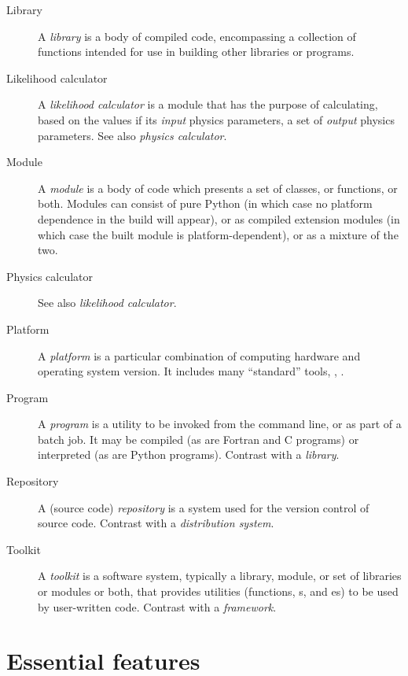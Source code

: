 \documentclass[draftmode,draftwater]{memarticle}
\begin{document}
\begin{description}
\item[Library] A \emph{library} is a body of compiled code,
  encompassing a collection of functions intended for use in building
  other libraries or programs.

\item[Likelihood calculator] A \emph{likelihood calculator} is a module
  that has the purpose of calculating, based on the values if its
  \emph{input} physics parameters, a set of \emph{output} physics parameters.
  See also \emph{physics calculator}.

\item[Module] A \emph{module} is a body of code which presents a set
  of classes, or functions, or both. Modules can consist of pure
  Python (in which case no platform dependence in the build will
  appear), or as compiled extension modules (in which case the built
  module is platform-dependent), or as a mixture of the two.

\item[Physics calculator]
See also \emph{likelihood calculator}.

\item[Platform] A \emph{platform} is a particular combination of
  computing hardware and operating system version. It includes many
  ``standard'' tools, \eg, .

\item[Program] A \emph{program} is a utility to be
  invoked from the command line, or as part of a batch job. It may be
  compiled (as are Fortran and C programs) or interpreted (as are
  Python programs). Contrast with a \emph{library}.

\item[Repository] A (source code) \emph{repository} is a system used
  for the version control of source code. Contrast with a
  \emph{distribution system}.

\item[Toolkit] A \emph{toolkit} is a software system, typically a
  library, module, or set of libraries or modules or both, that
  provides utilities (functions, s, and es)
  to be used by user-written code. Contrast with a \emph{framework}.

\end{description}

\chapter{Essential features}
\end{document}
